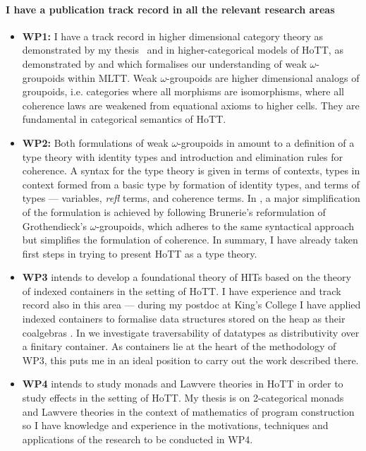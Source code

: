 \documentclass[a4paper]{article}
\newcommand{\mltt}{MLTT}
\begin{document}
\paragraph{I have a publication track record in all the relevant research areas}
\begin{itemize}
\item {\bf WP1:} I have a track record in higher dimensional category
  theory as demonstrated by my thesis~\cite{RypacekThesis} and in
  higher-categorical models of HoTT, as demonstrated by
   and 
  which formalises our understanding of weak $\omega$-groupoids within
  \mltt. Weak $\omega$-groupoids are higher dimensional analogs of
  groupoids, i.e. categories where all morphisms are isomorphisms,
  where all coherence laws are weakened from equational axioms to
  higher cells. They are fundamental in categorical semantics of HoTT.

\item {\bf WP2:} Both formulations of weak $\omega$-groupoids in
   amount to a
  definition of a type theory with identity types and introduction and
  elimination rules for coherence. A syntax for the type theory is
  given in terms of contexts, types in context formed from a basic
  type by formation of identity types, and terms of types ---
  variables, \emph{refl} terms, and coherence terms. In
  , a major simplification of the
  formulation is achieved by following Brunerie's reformulation of
  Grothendieck's $\omega$-groupoids, which adheres to the same
  syntactical approach but simplifies the formulation of coherence. In
  summary, I have already taken first steps in trying to present HoTT
  as a type theory.

\item {\bf WP3} intends to develop a foundational theory of HITs based
  on the theory of indexed containers in the setting of HoTT. I have
  experience and track record also in this area --- during my postdoc
  at King's College I have applied indexed containers to formalise
  data structures stored on the heap as their coalgebras
  . In  we
  investigate traversability of datatypes as distributivity over a
  finitary container. As containers lie at the heart of the
  methodology of WP3, this puts me in an ideal position to carry out
  the work described there.

\item {\bf WP4} intends to study monads and Lawvere theories in HoTT
  in order to study effects in the setting of HoTT.  My thesis
   is on 2-categorical monads and Lawvere
  theories in the context of mathematics of program construction so I
  have knowledge and experience in the motivations, techniques and
  applications of the research to be conducted in WP4.
\end{itemize}
\end{document}
